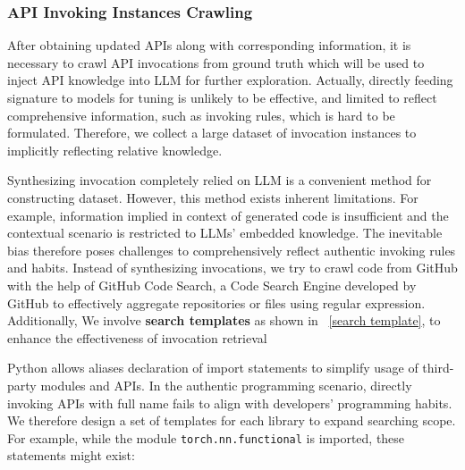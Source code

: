 \subsubsection{API Invoking Instances Crawling}
\label{appx_api_invocation_retrieval}

After obtaining updated APIs along with corresponding information, it is necessary to crawl API invocations from ground truth which will be used to inject API knowledge into LLM for further exploration. Actually, directly feeding signature to models for tuning is unlikely to be effective, and limited to reflect comprehensive information, such as invoking rules, which is hard to be formulated. Therefore, we collect a large dataset of invocation instances to implicitly reflecting relative knowledge. 

 Synthesizing invocation completely relied on LLM is a convenient method for constructing dataset. 
However, this method exists inherent limitations. 
For example, information implied in context of generated code is insufficient and the contextual scenario is restricted to LLMs' embedded knowledge. 
The inevitable bias therefore poses challenges to comprehensively reflect authentic invoking rules and habits.
Instead of synthesizing invocations, we try to crawl code from GitHub with the help of GitHub Code Search, a Code Search Engine developed by GitHub to effectively aggregate repositories or files using regular expression. 
Additionally, We involve \textbf{search templates} as shown in ~\ref{search template}, to enhance the effectiveness of invocation retrieval 

\label{search template}
Python allows aliases declaration of import statements to simplify usage of third-party modules and APIs.
In the authentic programming scenario, directly invoking APIs with full name fails to align with developers' programming habits. 
We therefore design a set of templates for each library to expand searching scope. For example, while the module \texttt{torch.nn.functional} is imported, these statements might exist:

